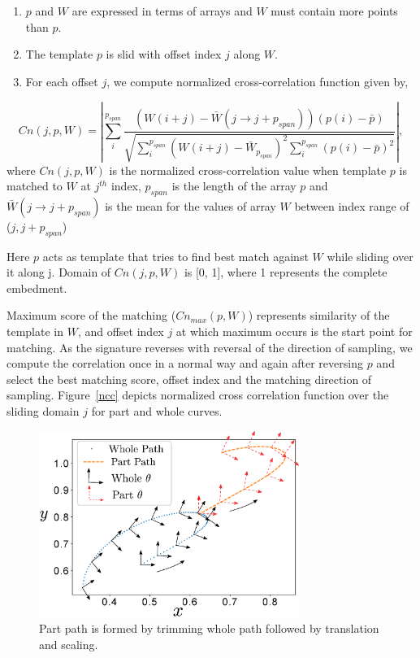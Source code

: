 \documentclass[twocolumn,10pt]{asme2e}
\begin{document}
\begin{enumerate}
  \item $p$ and $W$ are expressed in terms of arrays and $W$ must contain more points than $p$.
  \item The template $p$ is slid with offset index $j$ along $W$.
  \item For each offset $j$, we compute normalized cross-correlation function given by,
\end{enumerate}
\vspace{-0.6cm}
\begin{equation}\label{nccEq}
  Cn(j, p, W) = |\sum_{i}^{p_{span}} \frac{(W(i+j) - \bar{W}(j\to j + p_{span}))(p(i) - \bar{p})}{\sqrt{\sum_{i}^{p_{span}}{(W(i+j) - \bar{W}_{p_{span}})}^2\sum_{i}^{p_{span}}{(p(i) - \bar{p})}^2}} |,
\end{equation}
where $Cn(j, p, W)$ is the normalized cross-correlation value when template $p$ is matched to $W$ at $j^{th}$ index, $p_{span}$ is the length of the array $p$ and $\bar{W}(j\to j + p_{span})$ is the mean for the values of array $W$ between index range of ($j, j+p_{span}$)

Here $p$ acts as template that tries to find best match against $W$ while sliding over it along j.
Domain of $Cn(j, p, W)$ is [0, 1], where 1 represents the complete embedment.

Maximum score of the matching ($Cn_{max}(p, W)$) represents similarity of the template in $W$, and offset index $j$ at which maximum occurs is the start point for matching.
As the signature reverses with reversal of the direction of sampling, we compute the correlation once in a normal way and again after reversing $p$ and select the best matching score, offset index and the matching direction of sampling.
Figure~\ref{ncc} depicts normalized cross correlation function over the sliding domain $j$ for part and whole curves.

\begin{figure}
\centering
\includegraphics[width=240pt]{figure/fig_whole_part.eps}
  \caption{Part path is formed by trimming whole path followed by translation and scaling.}
\label{wholePart}
\end{figure}
\end{document}
